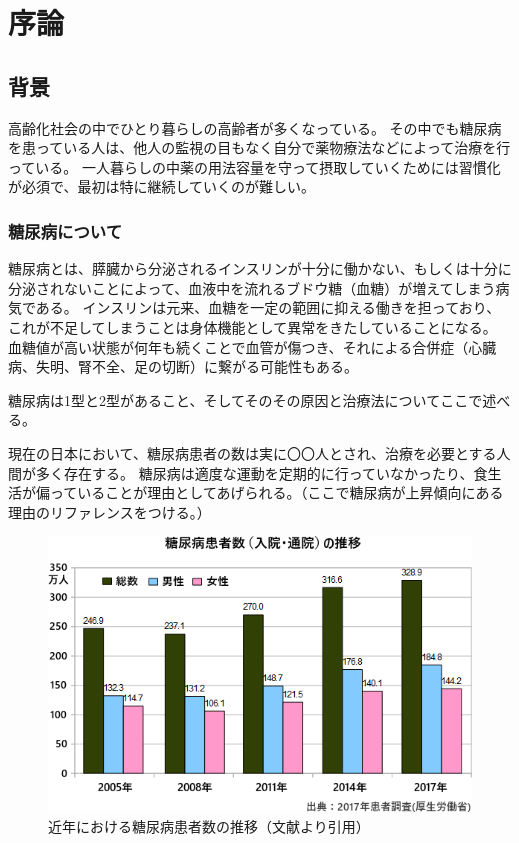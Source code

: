 \chapter{序論}
\label{chap:introduction}

\section{背景}
\label{section:background}
高齢化社会の中でひとり暮らしの高齢者が多くなっている。
その中でも糖尿病を患っている人は、他人の監視の目もなく自分で薬物療法などによって治療を行っている。
一人暮らしの中薬の用法容量を守って摂取していくためには習慣化が必須で、最初は特に継続していくのが難しい。

\subsection{糖尿病について}
\label{subsection:diabetes}

糖尿病とは、膵臓から分泌されるインスリンが十分に働かない、もしくは十分に分泌されないことによって、血液中を流れるブドウ糖（血糖）が増えてしまう病気である。\cite{diabetes}
インスリンは元来、血糖を一定の範囲に抑える働きを担っており、これが不足してしまうことは身体機能として異常をきたしていることになる。
血糖値が高い状態が何年も続くことで血管が傷つき、それによる合併症（心臓病、失明、腎不全、足の切断）に繋がる可能性もある。

糖尿病は1型と2型があること、そしてそのその原因と治療法についてここで述べる。

現在の日本において、糖尿病患者の数は実に〇〇人とされ、治療を必要とする人間が多く存在する。
糖尿病は適度な運動を定期的に行っていなかったり、食生活が偏っていることが理由としてあげられる。（ここで糖尿病が上昇傾向にある理由のリファレンスをつける。）

\begin{figure}[htbp]
  \caption{近年における糖尿病患者数の推移（文献\cite{diabetes_statistics}より引用）}
  \label{fig:diabetes_total_number}
  \begin{center}
    \includegraphics[bb=0 0 900 400,width=25cm]{assets/diabetes_total_number.png}
  \end{center}
\end{figure}

